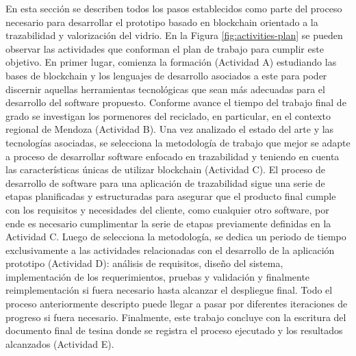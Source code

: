 En esta sección se describen todos los pasos establecidos como parte del proceso necesario para desarrollar el prototipo basado en blockchain orientado a la trazabilidad y valorización del vidrio. En la Figura \ref{fig:activities-plan} se pueden observar las actividades que conforman el plan de trabajo para cumplir este objetivo. En primer lugar, comienza la formación (Actividad A) estudiando las bases de blockchain y los lenguajes de desarrollo asociados a este para poder discernir aquellas herramientas tecnológicas que sean más adecuadas para el desarrollo del software propuesto. Conforme avance el tiempo del trabajo final de grado se investigan los pormenores del reciclado, en particular, en el contexto regional de Mendoza (Actividad B). Una vez analizado el estado del arte y las tecnologías asociadas, se selecciona la metodología de trabajo que mejor se adapte a proceso de desarrollar software enfocado en trazabilidad y teniendo en cuenta las características únicas de utilizar blockchain (Actividad C). El proceso de desarrollo de software para una aplicación de trazabilidad sigue una serie de etapas planificadas y estructuradas para asegurar que el producto final cumple con los requisitos y necesidades del cliente, como cualquier otro software, por ende es necesario cumplimentar la serie de etapas previamente definidas en la Actividad C. Luego de selecciona la metodología, se dedica un periodo de tiempo exclusivamente a las actividades relacionadas con el desarrollo de la aplicación prototipo (Actividad D): análisis de requisitos, diseño del sistema, implementación de los requerimientos, pruebas y validación y finalmente reimplementación si fuera necesario hasta alcanzar el despliegue final. Todo el proceso anteriormente descripto puede llegar a pasar por diferentes iteraciones de progreso si fuera necesario. Finalmente, este trabajo concluye con la escritura del documento final de tesina donde se registra el proceso ejecutado y los resultados alcanzados (Actividad E).


